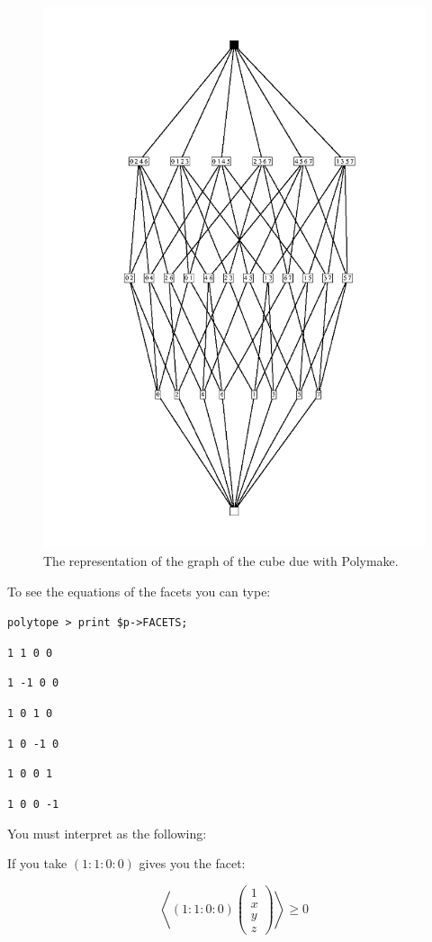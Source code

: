 \begin{figure}[htbp]
  \centering
  \includegraphics[width=0.9\linewidth]{l6_graph.jpg}
  
  \caption{The representation of the graph of the cube due with Polymake.}
\label{fig:l6:2}
\end{figure}

To see the equations of the facets you can type:

\texttt{polytope > print \$p->FACETS;}

\texttt{1 1 0 0}

\texttt{1 -1 0 0}

\texttt{1 0 1 0}

\texttt{1 0 -1 0}

\texttt{1 0 0 1}

\texttt{1 0 0 -1}

You must interpret as the following:

If you take $(1:1:0:0)$ gives you the facet: 

$$\left\langle(1:1:0:0)\left(\begin{array}{c}
                                                                     1\\	x\\	y\\	z
\end{array}\right)\right\rangle\geqslant 0$$

